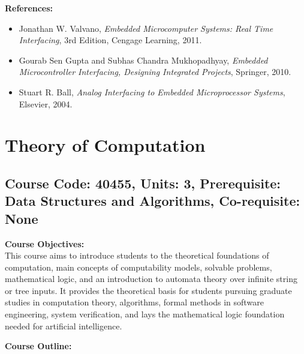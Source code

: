 \documentclass[12pt]{article}
\begin{document}
\textbf{References:}
\begin{itemize}
    \item Jonathan W. Valvano, \textit{Embedded Microcomputer Systems: Real Time Interfacing}, 3rd Edition, Cengage Learning, 2011.
    \item Gourab Sen Gupta and Subhas Chandra Mukhopadhyay, \textit{Embedded Microcontroller Interfacing, Designing Integrated Projects}, Springer, 2010.
    \item Stuart R. Ball, \textit{Analog Interfacing to Embedded Microprocessor Systems}, Elsevier, 2004.
\end{itemize}

\newpage

\section{Theory of Computation}
\subsection*{Course Code: 40455, Units: 3, Prerequisite: Data Structures and Algorithms, Co-requisite: None}

\textbf{Course Objectives:} \\
This course aims to introduce students to the theoretical foundations of computation, main concepts of computability models, solvable problems, mathematical logic, and an introduction to automata theory over infinite string or tree inputs. It provides the theoretical basis for students pursuing graduate studies in computation theory, algorithms, formal methods in software engineering, system verification, and lays the mathematical logic foundation needed for artificial intelligence.

\textbf{Course Outline:}
\end{document}
